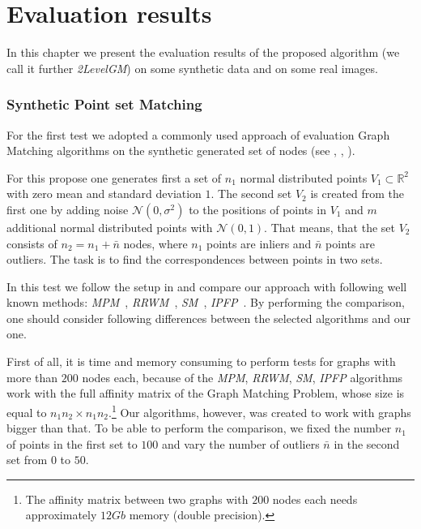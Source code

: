 \chapter{Evaluation results} \label{chapter:results}

In this chapter we present the evaluation results of the proposed algorithm (we call it further \emph{2LevelGM}) on some synthetic data and on some real images.

\subsection{Synthetic Point set Matching}

For the first test we adopted a commonly used approach of evaluation Graph Matching algorithms on the synthetic generated set of nodes (see \cite{Cho2014_Haystack}, \cite{Cho2010_RRWM}, \cite{Leordeanu2009_IPFP}). 

For this propose one generates first a set of $n_1$ normal distributed points $V_1\subset\mathbb{R}^2$ with zero mean and standard deviation $1$. The second set $V_2$ is created from the first one by adding noise $\mathcal{N}(0,\sigma^2)$ to the positions of points in $V_1$ and $m$ additional normal distributed points with $\mathcal{N}(0,1)$.  That means, that the set $V_2$ consists of $n_2=n_1+\bar{n}$ nodes, where $n_1$ points are inliers and $\bar{n}$ points are outliers. The task is to find the correspondences between points in two sets.

In this test we follow the setup in \cite{Cho2014_Haystack} and compare our approach with following well known 
methods: \emph{MPM}~\cite{Cho2014_Haystack}, \emph{RRWM}~\cite{Cho2010_RRWM}, \emph{SM}~\cite{Leordeanu2005_SM}, \emph{IPFP}~\cite{Leordeanu2009_IPFP}. By performing the comparison, one should consider following differences between the selected algorithms and our one.

First of all, it is time and memory consuming to perform tests for graphs with more than $200$ nodes each, because of the \emph{MPM}, \emph{RRWM}, \emph{SM}, \emph{IPFP} algorithms work with the full affinity matrix of the Graph Matching Problem, whose size is equal to $n_1n_2\times n_1n_2$.\footnote{The affinity matrix between two graphs with $200$ nodes each needs approximately $12Gb$ memory (double precision).} Our algorithms, however, was created to work with graphs bigger than that. To be able to perform the comparison, we fixed the number $n_1$ of points in the first set to $100$ and vary the number of outliers $\bar{n}$ in the second set from $0$ to $50$.

